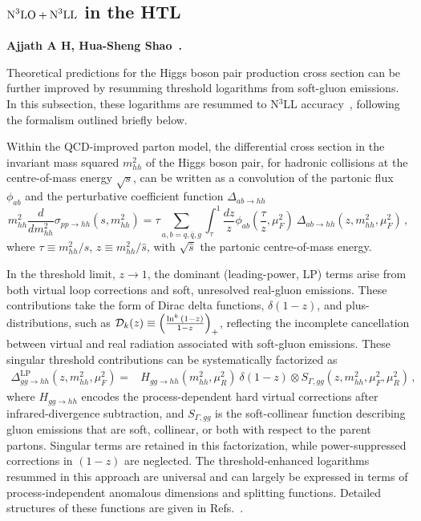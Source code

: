 \subsection[\texorpdfstring{$\textup{N}^3\textup{LO} + \textup{N}^3\textup{LL}$ in the HTL}{N3LO + N3LL in the HTL}]{\texorpdfstring{\boldmath$\textup{N}^3\textup{LO} + \textup{N}^3\textup{LL}$ in the HTL}{N3LO + N3LL in the HTL}}


\textbf{Ajjath A H, Hua-Sheng Shao~\cite{Ajjath:2022kpv}.}

\noindent Theoretical predictions for the Higgs boson pair production cross section can be further improved by resumming threshold logarithms from soft-gluon emissions. In this subsection, these logarithms are resummed to N$^3$LL accuracy~\cite{Ajjath:2022kpv}, following the formalism outlined briefly below.

Within the QCD-improved parton model, the differential cross section in the invariant mass squared $m_{hh}^2$
of the Higgs boson pair, for hadronic collisions at the centre-of-mass energy $\sqrt{s}$, can be written as a convolution of the partonic flux $\phi_{ab}$ and the perturbative coefficient function $\Delta_{ab\to hh}$
\begin{equation}\label{eq:partonmodel}
    m_{hh}^2 \dfrac{d}{d m_{hh}^2}\sigma_{pp\rightarrow hh}(s,m_{hh}^2) = \tau \sum_{a,b=q,\bar q,g} \int_\tau^1 \frac{dz}{z} \phi_{ab}\left(\frac{\tau}{z},\mu_F^2\right)~ \Delta_{ab\rightarrow hh}  \left(z,m_{hh}^2,\mu_F^2\right)\,,
\end{equation}
where $\tau\equiv m_{hh}^2/s$, $z\equiv m_{hh}^2/\hat{s}$, with $\sqrt{\hat{s}}$
the partonic centre-of-mass energy.

 In the threshold limit, $z\rightarrow1$, the dominant (leading-power, LP) terms arise from both virtual loop corrections and soft, unresolved real-gluon emissions. These contributions take the form of Dirac delta functions, $\delta(1-z)$,  and plus-distributions, such as $ {\cal D}_k(z) \equiv  \left(\frac{\ln^k{(1-z)}}{1-z}\right)_+$, reflecting the incomplete cancellation between virtual and real radiation associated with soft-gluon emissions. These singular threshold contributions can be systematically factorized as
\begin{align}\label{eq:partonicxsec}
    \Delta^{\text{LP}}_{gg\rightarrow hh}(z,m_{hh}^2,\mu_F^2) =& H_{gg\rightarrow hh}(m_{hh}^2,\mu_R^2) ~\delta(1-z)\otimes S_{\Gamma,gg}(z,m_{hh}^2,\mu_F^2,\mu_R^2)\,,
\end{align}
where $H_{gg\rightarrow hh}$ encodes the process-dependent hard virtual corrections after infrared-divergence subtraction, and
 $S_{\Gamma,gg}$
  is the soft-collinear function describing gluon emissions that are soft, collinear, or both with respect to the parent partons. Singular terms are retained in this factorization, while power-suppressed corrections in $(1-z)$ are neglected. The threshold-enhanced logarithms resummed in this approach are universal and can largely be expressed in terms of process-independent anomalous dimensions and splitting functions. Detailed structures of these functions are given in Refs.~\cite{Ravindran:2005vv,Ahmed:2020nci,Ajjath:2022kpv}.

